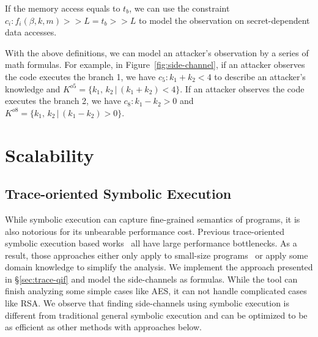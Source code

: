 If the memory access equals to $t_b$, we can use the constraint $c_i :
f_i(\beta, k, m) >> L = t_b >> L$ to model the observation on secret-dependent
data accesses.

With the above definitions, we can model an attacker's observation by a series of math
formulas. For example, in Figure~\ref{fig:side-channel}, if an attacker observes
the code executes the branch 1, we have $c_5: k_1 + k_2 < 4$ to describe an
attacker's knowledge and $K^{o5} = \{k_1,\, k_2\,|\, (k_1 + k_2) < 4\}$. If an
attacker observes the code executes the branch 2, we have $c_8: k_1 - k_2 > 0$
and $K^{o8} = \{k_1,\, k_2\,|\, (k_1 - k_2) > 0\}$.
\section{Scalability}
\subsection{Trace-oriented Symbolic Execution}
While symbolic execution can capture fine-grained semantics of programs, it
is also notorious for its unbearable performance cost. Previous trace-oriented
symbolic execution based
works~\cite{203878,Chattopadhyay:2017:QIL:3127041.3127044} all have large
performance bottlenecks. As a result, those approaches either only apply to
small-size programs~\cite{Chattopadhyay:2017:QIL:3127041.3127044} or apply some
domain knowledge to simplify the analysis. 
We implement the approach presented in \S\ref{sec:trace-qif} and model the side-channels as formulas. While the tool can finish analyzing some simple cases like AES, it can
not handle complicated cases like RSA.
We observe that finding side-channels using symbolic execution is different from
traditional general symbolic execution and can be optimized to be as efficient
as other methods with approaches below.

